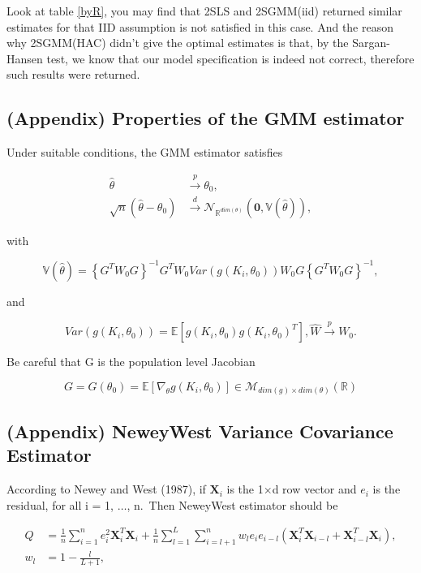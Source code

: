 \documentclass[
  12pt,
]{article}
\begin{document}
Look at table \ref{byR}, you may find that 2SLS and 2SGMM(iid) returned similar estimates for that IID assumption is not satisfied in this case. And the reason why 2SGMM(HAC) didn't give the optimal estimates is that, by the Sargan-Hansen test, we know that our model specification is indeed not correct, therefore such results were returned.

\hypertarget{appendix-properties-of-the-gmm-estimator}{%
\subsection{(Appendix) Properties of the GMM estimator}\label{appendix-properties-of-the-gmm-estimator}}

Under suitable conditions, the GMM estimator satisfies

\begin{align*}
    \hat{\theta} &  \stackrel{p}{\to} \theta_0,\\
    \sqrt{n}(\hat{\theta} - \theta_0) & \stackrel{d}{\to} \mathcal{N}_{\mathbb{R}^{dim(\theta)}}(\mathbf{0}, \mathbb{V}(\hat{\theta})),
\end{align*}

with

\[
    \mathbb{V}(\hat{\theta}) = \left\{G^T W_0 G \right\}^{-1} G^T W_0 Var\left( g(K_i, \theta_0)\right) W_0 G\left\{G^T W_0 G \right\}^{-1},
\]

and

\[
     Var\left( g(K_i, \theta_0)\right) = \mathbb{E}\left[g(K_i, \theta_0)g(K_i, \theta_0)^T \right], \widehat{W} \stackrel{p}{\to} W_0.
\]

Be careful that G is the population level Jacobian

\[
    G = G(\theta_0) = \mathbb{E}\left[\nabla_\theta g(K_i, \theta_0) \right] \in \mathcal{M}_{dim(g)\times dim(\theta)}(\mathbb{R})
\]

\hypertarget{appendix-neweywest-variance-covariance-estimator}{%
\subsection{(Appendix) NeweyWest Variance Covariance Estimator}\label{appendix-neweywest-variance-covariance-estimator}}

According to Newey and West (1987), if \(\mathbf{X}_i\) is the 1\(\times\)d row vector and \(e_i\) is the residual, for all i = 1, \(\dots\), n.~Then NeweyWest estimator should be

\begin{align*}
    Q & = \frac{1}{n}\sum_{i=1}^{n}e_i^2 \mathbf{X}_i^T \mathbf{X}_i + \frac{1}{n}\sum_{l=1}^{L}\sum_{i = l+1}^{n}w_l e_i e_{i-l} \left(\mathbf{X}_i^T \mathbf{X}_{i-l} + \mathbf{X}_{i-l}^T \mathbf{X}_i \right),\\
    w_l & = 1 - \frac{l}{L + 1},
\end{align*}
\end{document}
